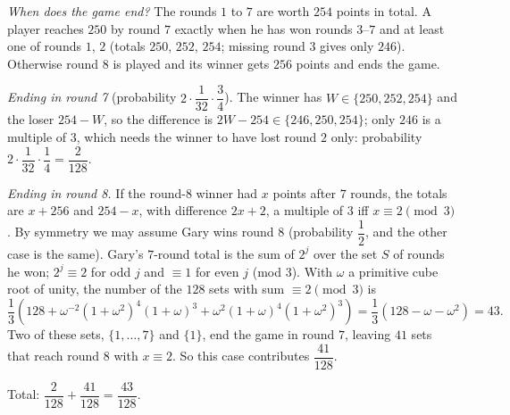\emph{When does the game end?} The rounds $1$ to $7$ are worth $254$ points in total. A player reaches $250$ by round $7$ exactly when he has won rounds $3$--$7$ and at least one of rounds $1$, $2$ (totals $250$, $252$, $254$; missing round $3$ gives only $246$). Otherwise round $8$ is played and its winner gets $256$ points and ends the game.

\emph{Ending in round 7} (probability $2\cdot\dfrac{1}{32}\cdot\dfrac{3}{4}$). The winner has $W\in\{250,252,254\}$ and the loser $254-W$, so the difference is $2W-254\in\{246,250,254\}$; only $246$ is a multiple of $3$, which needs the winner to have lost round $2$ only: probability $2\cdot\dfrac{1}{32}\cdot\dfrac{1}{4}=\dfrac{2}{128}$.

\emph{Ending in round 8.} If the round-$8$ winner had $x$ points after $7$ rounds, the totals are $x+256$ and $254-x$, with difference $2x+2$, a multiple of $3$ iff $x\equiv2\pmod3$. By symmetry we may assume Gary wins round $8$ (probability $\dfrac{1}{2}$, and the other case is the same). Gary's $7$-round total is the sum of $2^j$ over the set $S$ of rounds he won; $2^j\equiv2$ for odd $j$ and $\equiv1$ for even $j$ (mod $3$). With $\omega$ a primitive cube root of unity, the number of the $128$ sets with sum $\equiv2\pmod3$ is
\[\dfrac{1}{3}\left(128+\omega^{-2}(1+\omega^2)^4(1+\omega)^3+\omega^{2}(1+\omega)^4(1+\omega^2)^3\right)=\dfrac{1}{3}\left(128-\omega-\omega^2\right)=43.\]
Two of these sets, $\{1,\dots,7\}$ and $\{1\}$, end the game in round $7$, leaving $41$ sets that reach round $8$ with $x\equiv2$. So this case contributes $\dfrac{41}{128}$.

Total: $\dfrac{2}{128}+\dfrac{41}{128}=\boxed{\dfrac{43}{128}}$.
